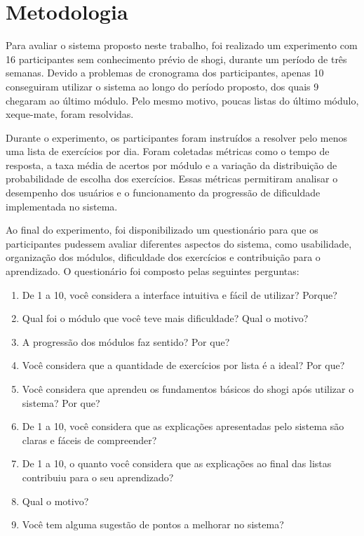 
\chapter{Metodologia}
\label{cap:metodologia}

Para avaliar o sistema proposto neste trabalho, foi realizado um experimento com 16 participantes sem conhecimento prévio de shogi, 
durante um período de três semanas. Devido a problemas de cronograma dos participantes, apenas 10 conseguiram utilizar o sistema ao 
longo do período proposto, dos quais 9 chegaram ao último módulo. Pelo mesmo motivo, poucas listas do último módulo, xeque-mate, 
foram resolvidas.

Durante o experimento, os participantes foram instruídos a resolver pelo menos uma lista de exercícios por dia. Foram coletadas 
métricas como o tempo de resposta, a taxa média de acertos por módulo e a variação da distribuição de probabilidade de escolha dos exercícios. 
Essas métricas permitiram analisar o desempenho dos usuários e o funcionamento da progressão de dificuldade implementada no sistema.

Ao final do experimento, foi disponibilizado um questionário para que os participantes pudessem avaliar diferentes aspectos do 
sistema, como usabilidade, organização dos módulos, dificuldade dos exercícios e contribuição para o aprendizado. O questionário foi 
composto pelas seguintes perguntas:

\begin{enumerate}
    \item De 1 a 10, você considera a interface intuitiva e fácil de utilizar? Porque?
    \item Qual foi o módulo que você teve mais dificuldade? Qual o motivo?
    \item A progressão dos módulos faz sentido? Por que?
    \item Você considera que a quantidade de exercícios por lista é a ideal? Por que?
    \item Você considera que aprendeu os fundamentos básicos do shogi após utilizar o sistema? Por que?
    \item De 1 a 10, você considera que as explicações apresentadas pelo sistema são claras e fáceis de compreender?
    \item De 1 a 10, o quanto você considera que as explicações ao final das listas contribuiu para o seu aprendizado?
    \item Qual o motivo?
    \item Você tem alguma sugestão de pontos a melhorar no sistema?
\end{enumerate}